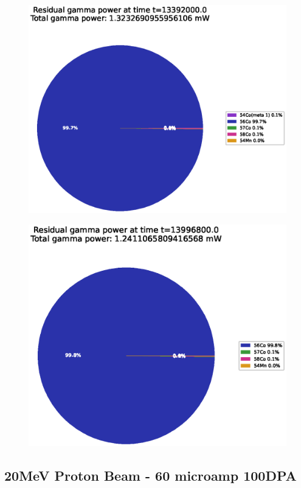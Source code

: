 \begin{figure}[!htb]
\centering
\includegraphics[width=0.7\linewidth]{chapters/activity_code/fe_100dpa/endofbeam/15MeV_0400_13392000.eps}
\caption{}
\label{fig:5mev-proton-100dpa}
\end{figure}

\begin{figure}[!htb]
\centering
\includegraphics[width=0.7\linewidth]{chapters/activity_code/fe_100dpa/endofbeam/15MeV_0500_13996800.eps}
\caption{}
\label{fig:5mev-proton-100dpa}
\end{figure}



\clearpage
\FloatBarrier
\subsection{20MeV Proton Beam - 60 microamp 100DPA}

